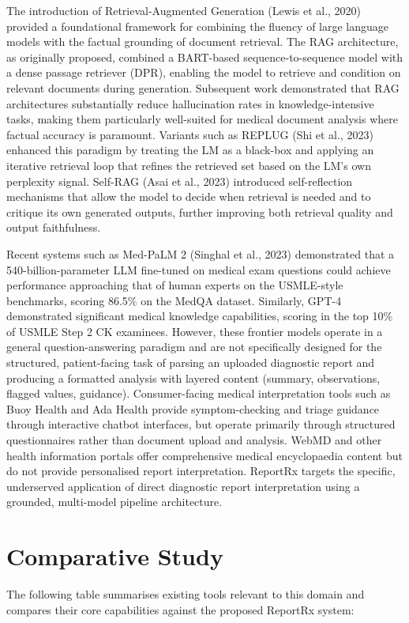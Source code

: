 The introduction of Retrieval-Augmented Generation (Lewis et al., 2020) provided a foundational framework for combining the fluency of large language models with the factual grounding of document retrieval. The RAG architecture, as originally proposed, combined a BART-based sequence-to-sequence model with a dense passage retriever (DPR), enabling the model to retrieve and condition on relevant documents during generation. Subsequent work demonstrated that RAG architectures substantially reduce hallucination rates in knowledge-intensive tasks, making them particularly well-suited for medical document analysis where factual accuracy is paramount. Variants such as REPLUG (Shi et al., 2023) enhanced this paradigm by treating the LM as a black-box and applying an iterative retrieval loop that refines the retrieved set based on the LM's own perplexity signal. Self-RAG (Asai et al., 2023) introduced self-reflection mechanisms that allow the model to decide when retrieval is needed and to critique its own generated outputs, further improving both retrieval quality and output faithfulness.

Recent systems such as Med-PaLM 2 (Singhal et al., 2023) demonstrated that a 540-billion-parameter LLM fine-tuned on medical exam questions could achieve performance approaching that of human experts on the USMLE-style benchmarks, scoring 86.5\% on the MedQA dataset. Similarly, GPT-4 demonstrated significant medical knowledge capabilities, scoring in the top 10\% of USMLE Step 2 CK examinees. However, these frontier models operate in a general question-answering paradigm and are not specifically designed for the structured, patient-facing task of parsing an uploaded diagnostic report and producing a formatted analysis with layered content (summary, observations, flagged values, guidance). Consumer-facing medical interpretation tools such as Buoy Health and Ada Health provide symptom-checking and triage guidance through interactive chatbot interfaces, but operate primarily through structured questionnaires rather than document upload and analysis. WebMD and other health information portals offer comprehensive medical encyclopaedia content but do not provide personalised report interpretation. ReportRx targets the specific, underserved application of direct diagnostic report interpretation using a grounded, multi-model pipeline architecture.

\section{Comparative Study}
The following table summarises existing tools relevant to this domain and compares their core capabilities against the proposed ReportRx system:

